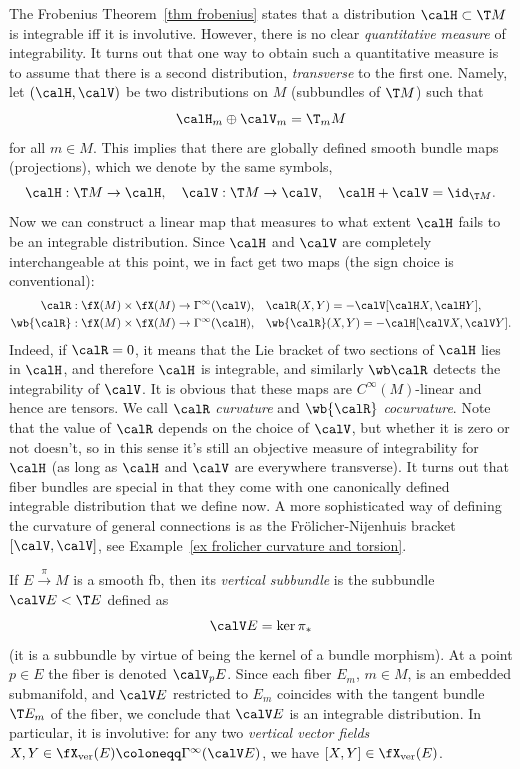 The Frobenius Theorem~\ref{thm frobenius} states that a distribution $\calH\subset \T M$ is integrable iff it is involutive. However, there is no clear \emph{quantitative measure} of integrability. It turns out that one way to obtain such a quantitative measure is to assume that there is a second distribution, \emph{transverse} to the first one. Namely, let $(\calH,\calV)$ be two distributions on $M$ (subbundles of $\T M$) such that
\[\calH_m\oplus \calV_m=\T_mM\]
for all $m\in M$. This implies that there are globally defined smooth bundle maps (projections), which we denote by the same symbols,
\[\calH:\T M\to \calH,\quad \calV:\T M\to \calV,\quad \calH+\calV=\id_{\T M}.\]
Now we can construct a linear map that measures to what extent $\calH$ fails to be an integrable distribution. Since $\calH$ and $\calV$ are completely interchangeable at this point, we in fact get two maps (the sign choice is conventional):
\begin{align}
    \calR:\fX(M)\times\fX(M)\to \Gamma^\infty(\calV),\quad & \calR(X,Y)=-\calV[\calH X,\calH Y],\\
    \wb{\calR}:\fX(M)\times\fX(M)\to \Gamma^\infty(\calH),\quad & \wb{\calR}(X,Y)=-\calH[\calV X,\calV Y].
\end{align}
Indeed, if $\calR=0$, it means that the Lie bracket of two sections of $\calH$ lies in $\calH$, and therefore $\calH$ is integrable, and similarly $\wb \calR$ detects the integrability of $\calV$. It is obvious that these maps are $C^\infty(M)$-linear and hence are tensors. We call $\calR$ \emph{curvature} and $\wb{\calR}$ \emph{cocurvature}. Note that the value of $\calR$ depends on the choice of $\calV$, but whether it is zero or not doesn't, so in this sense it's still an objective measure of integrability for $\calH$ (as long as $\calH$ and $\calV$ are everywhere transverse). It turns out that fiber bundles are special in that they come with one canonically defined integrable distribution that we define now. A more sophisticated way of defining the curvature of general connections is as the Fr\"olicher-Nijenhuis bracket $[\calV,\calV]$, see Example~\ref{ex frolicher curvature and torsion}.

\begin{defn}
    If $E\overset{\pi}{\to}M$ is a smooth \gls{fb}, then its \emph{vertical subbundle} is the subbundle $\calV E< \T E$ defined as 
    \[\calV E=\ker \pi_\ast\]
    (it is a subbundle by virtue of being the kernel of a bundle morphism). At a point $p\in E$ the fiber is denoted $\calV_pE$. Since each fiber $E_m$, $m\in M$, is an embedded submanifold, and $\calV E$ restricted to $E_m$ coincides with the tangent bundle $\T E_m$ of the fiber, we conclude that $\calV E$ is an integrable distribution. In particular, it is involutive: for any two \emph{vertical vector fields} $X,Y\in \fX_{\mathrm{ver}}(E)\coloneqq\Gamma^\infty(\calV E)$, we have $[X,Y]\in \fX_{\mathrm{ver}}(E)$.
\end{defn}

